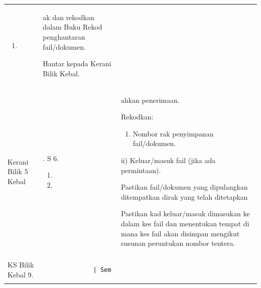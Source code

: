 \documentclass[
]{article}
\providecommand{\tightlist}{%
  \setlength{\itemsep}{0pt}\setlength{\parskip}{0pt}}
\begin{document}
\begin{longtable}[]{@{}lll@{}}
\begin{minipage}[t]{0.30\columnwidth}
\begin{enumerate}
\def\labelenumi{\arabic{enumi}.}
\setcounter{enumi}{3}
\item
\end{enumerate}\strut
\end{minipage} & \begin{minipage}[t]{0.30\columnwidth}\raggedright
ak dan rekodkan dalam Buku Rekod penghantaran fail/dokumen.

Hantar kepada Kerani Bilik Kebal.\strut
\end{minipage}\tabularnewline
\begin{minipage}[t]{0.30\columnwidth}\raggedright
Kerani Bilik \textbar{} 5 Kebal \textbar{}\strut
\end{minipage} & \begin{minipage}[t]{0.30\columnwidth}\raggedright
. \textbar{} S \textbar{} 6.

\begin{enumerate}
\def\labelenumi{\arabic{enumi}.}
\setcounter{enumi}{6}
\item
\item
\end{enumerate}\strut
\end{minipage} & \begin{minipage}[t]{0.30\columnwidth}\raggedright
ahkan penerimaan.

Rekodkan:

\begin{enumerate}
\def\labelenumi{\roman{enumi})}
\tightlist
\item
  Nombor rak penyimpanan fail/dokumen.
\end{enumerate}

ii) Keluar/masuk fail (jika ada permintaan).

Pastikan fail/dokumen yang dipulangkan ditempatkan dirak yang telah
ditetapkan

Pastikan kad keluar/masuk dimasukan ke dalam kes fail dan menentukan
tempat di mana kes fail akan disimpan mengikut susunan peruntukan nombor
tentera.\strut
\end{minipage}\tabularnewline
\begin{minipage}[t]{0.30\columnwidth}\raggedright
KS Bilik Kebal \textbar{} 9.\strut
\end{minipage} & \begin{minipage}[t]{0.30\columnwidth}\raggedright
\begin{verbatim}
              | Sem
\end{verbatim}


\end{minipage}
\end{longtable}
\end{document}
